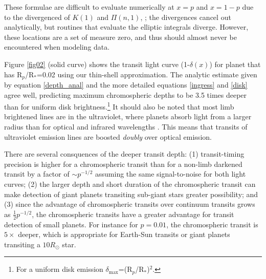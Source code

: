 \documentclass[manuscript]{aastex}
\newcommand{\p}{R$_p$/R$_*$}
\begin{document}
These formulae are difficult to evaluate numerically at 
$x=p$ and $x=1-p$ due to the divergenced of $K(1)$ and $\Pi(n,1)$,
; the divergences cancel out analytically, but routines that
evaluate the elliptic integrals diverge.  However, these locations
are a set of measure zero, and thus should almost never be encountered
when modeling data.


Figure \ref{fig02} (solid curve) shows the transit light curve (1-$\delta (x)$) for planet that has \p =0.02 using our thin-shell approximation.  The analytic estimate given by equation \ref{depth_anal} and the more detailed equations \ref{ingress} and \ref{disk} agree well, predicting maximum chromospheric depths to be 3.5 times
deeper than for uniform disk brightness.\footnote{For a uniform disk emission $\delta_{\mathrm{max}} $=(\p )$^2$.} It should also be noted that most limb brightened lines are in the ultraviolet, where planets absorb light from a larger radius than for optical and infrared wavelengths \citep{vidmad}. This means that transits of ultraviolet emission lines are boosted {\it doubly} over optical emission.

There are several consquences of the deeper transit depth:
(1) transit-timing precision is higher for a chromospheric
transit than for a non-limb darkened transit by a factor of
$\sim p^{-1/2}$ assuming the same signal-to-noise for
both light curves; (2) the larger depth and short duration
of the chromospheric transit can make detection of giant
planets transiting sub-giant stars greater possibility;
and (3) since the advantage of chromospheric transits
over continuum transits grows as $\frac{1}{2}p^{-1/2}$,
the chromospheric transits have a greater advantage for
transit detection of small planets. For instance
for $p=0.01$, the chromospheric transit is $5\times$
deeper, which is appropriate for Earth-Sun transits
or giant planets transiting a $10R_\odot$ star.
\end{document}

